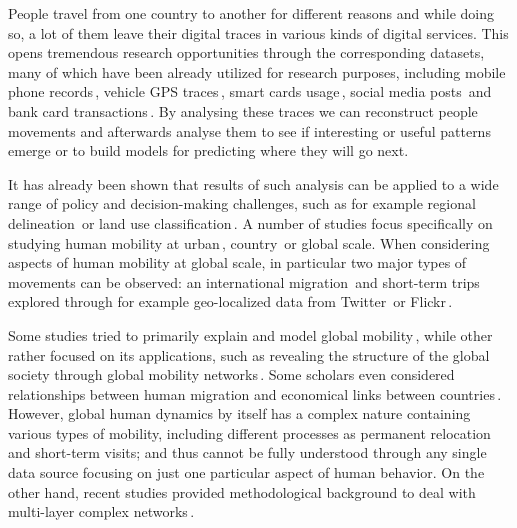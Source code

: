 \documentclass[aps,superscriptaddress,showkeys,nofootinbib]{revtex4-1}
\begin{document}
People travel from one country to another for different reasons and while doing so, a lot of them leave their digital traces in various kinds of digital services. This opens tremendous research opportunities through the corresponding datasets, many of which have been already utilized for research purposes, including mobile phone records\,\cite{ratti2006mlu,calabrese2006real,girardin2008digital,quercia2010rse}, vehicle GPS traces\,\cite{santi2013taxi,kang2013exploring}, smart cards usage\,\cite{bagchi2005,lathia2012}, social media posts\,\cite{java2007we,szell2013,frank2013happiness} and bank card transactions\,\cite{sobolevsky2014mining,sobolevsky2014money,sobolevsky2015cities,sobolevsky2015predicting}. By analysing these traces we can reconstruct people movements and afterwards analyse them to see if interesting or useful patterns emerge or to build models for predicting where they will go next.

It has already been shown that results of such analysis can be applied to a wide range of policy and decision-making challenges, such as for example regional delineation\,\cite{ratti2010redrawing,sobolevsky2013delineating} or land use classification\,\cite{pei2014new,grauwin2014towards}. A number of studies focus specifically on studying human mobility at urban\,\cite{gonzalez2008uih,kung2014exploring,hoteit2014estimating}, country\,\cite{amini2014impact} or global scale. When considering aspects of human mobility at global scale, in particular two major types of movements can be observed: an international migration\,\cite{greenwood1985human,fagiolo2013international,abel2014quantifying,tranos2012international} and short-term trips explored through for example geo-localized data from Twitter\,\cite{hawelka2014} or Flickr\,\cite{paldino2015flickr,sobolevsky2015scaling}.

Some studies tried to primarily explain and model global mobility\,\cite{greenwood1985human,fagiolo2013international,abel2014quantifying,tranos2012international}, while other rather focused on its applications, such as revealing the structure of the global society through global mobility networks\,\cite{ratti2010redrawing,sobolevsky2013delineating,hawelka2014}. Some scholars even considered relationships between human migration and economical links between countries\,\cite{sgrignoli2015relation,fagiolo2014does}. However, global human dynamics by itself has a complex nature containing various types of mobility, including different processes as permanent relocation and short-term visits; and thus cannot be fully understood through any single data source focusing on just one particular aspect of human behavior. On the other hand, recent studies provided methodological background to deal with multi-layer complex networks\,\cite{kivela2014multilayer}.
\end{document}
